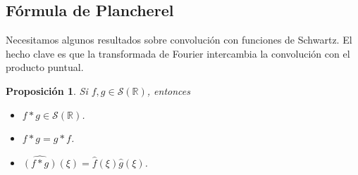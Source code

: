 \documentclass[12pt]{article}
\newcommand{\Sc}{\mathcal{S}(\mathbb{R})}
\theoremstyle{plain}
\newtheorem{proposicion}[teorema]{Proposición}
\theoremstyle{definition}
\numberwithin{equation}{section}
\begin{document}
        \subsection{Fórmula de Plancherel}
            Necesitamos algunos resultados sobre convolución con funciones de Schwartz. El hecho clave es que la transformada de Fourier intercambia la convolución con el producto puntual.
            \begin{proposicion}
                Si \(f, g \in \Sc\), entonces
                \begin{itemize}
                    \item[(i)] \(f * g \in \Sc\).
                    \item[(ii)] \(f * g = g * f\).
                    \item[(iii)] \(\widehat{(f * g)}(\xi) = \hat{f}(\xi)\hat{g}(\xi)\).
                \end{itemize}
            \end{proposicion}
\end{document}
